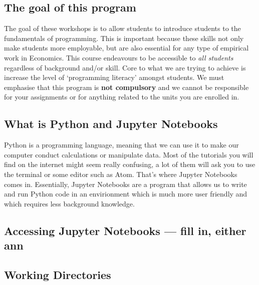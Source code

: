 \documentclass[11pt]{article}
\begin{document}
    \hypertarget{the-goal-of-this-program}{%
\subsection{The goal of this program}\label{the-goal-of-this-program}}

The goal of these workshops is to allow students to introduce students
to the fundamentals of programming. This is important because these
skills not only make students more employable, but are also essential
for any type of empirical work in Economics. This course endeavours to
be accessible to \emph{all students} regardless of background and/or
skill. Core to what we are trying to achieve is increase the level of
`programming literacy' amongst students. We must emphasise that this
program is \textbf{not compulsory} and we cannot be responsible for your
assignments or for anything related to the units you are enrolled in.

    \hypertarget{what-is-python-and-jupyter-notebooks}{%
\subsection{What is Python and Jupyter
Notebooks}\label{what-is-python-and-jupyter-notebooks}}

Python is a programming language, meaning that we can use it to make our
computer conduct calculations or manipulate data. Most of the tutorials
you will find on the internet might seem really confusing, a lot of them
will ask you to use the terminal or some editor such as Atom. That's
where Jupyter Notebooks comes in. Essentially, Jupyter Notebooks are a
program that allows us to write and run Python code in an envirionment
which is much more user friendly and which requires less background
knowledge.

\hypertarget{accessing-jupyter-notebooks-fill-in-either-ann}{%
\subsection{Accessing Jupyter Notebooks --- fill in, either
ann}\label{accessing-jupyter-notebooks-fill-in-either-ann}}

\hypertarget{working-directories}{%
\subsection{Working Directories}\label{working-directories}}
\end{document}

